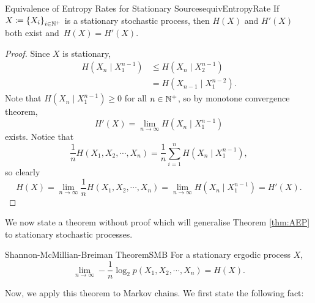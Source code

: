 \documentclass[math, code]{amznotes}
\theoremstyle{remark}
\begin{document}
\begin{thmbox}{Equivalence of Entropy Rates for Stationary Sources}{equivEntropyRate}
    If $X \coloneqq \left\{X_i\right\}_{i \in \mathbb{N}^+}$ is a stationary stochastic process, then $H\left(X\right)$ and $H'\left(X\right)$ both exist and~$H\left(X\right) = H'\left(X\right)$.
    \tcblower
    \begin{proof}
        Since $X$ is stationary, 
        \begin{align*}
            H\left(X_n \mid X_1^{n - 1}\right) & \leq H\left(X_n \mid X_2^{n - 1}\right) \\
            & = H\left(X_{n - 1} \mid X_1^{n - 2}\right).
        \end{align*}
        Note that $H\left(X_n \mid X_1^{n - 1}\right) \geq 0$ for all $n \in \mathbb{N}^+$, so by monotone convergence theorem, 
        \begin{equation*}
            H'\left(X\right) = \lim_{n \to \infty}H\left(X_n \mid X_1^{n - 1}\right)
        \end{equation*}
        exists. Notice that 
        \begin{equation*}
            \frac{1}{n}H\left(X_1, X_2, \cdots, X_n\right) = \frac{1}{n}\sum_{i = 1}^{n}H\left(X_n \mid X_1^{n - 1}\right),
        \end{equation*}
        so clearly 
        \begin{equation*}
            H\left(X\right) = \lim_{n \to \infty}\frac{1}{n}H\left(X_1, X_2, \cdots, X_n\right) = \lim_{n \to \infty}H\left(X_n \mid X_1^{n - 1}\right) = H'\left(X\right).
        \end{equation*}
    \end{proof}
\end{thmbox}
We now state a theorem without proof which will generalise Theorem \ref{thm:AEP} to stationary stochastic processes.
\begin{thmbox}{Shannon-McMillian-Breiman Theorem}{SMB}
    For a stationary ergodic process $X$, 
    \begin{equation*}
        \lim_{n \to \infty}-\frac{1}{n}\log_2p\left(X_1, X_2, \cdots, X_n\right) = H\left(X\right).
    \end{equation*}
\end{thmbox}
Now, we apply this theorem to Markov chains. We first state the following fact:
\end{document}
